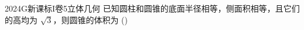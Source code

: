 
\begin{problem}{2024}{G}{新课标I卷}{5}{立体几何}
已知圆柱和圆锥的底面半径相等，侧面积相等，且它们的高均为 $\sqrt{3}$，则圆锥的体积为
(\hspace{1cm})
\begin{choices}
\end{choices}
\end{problem}